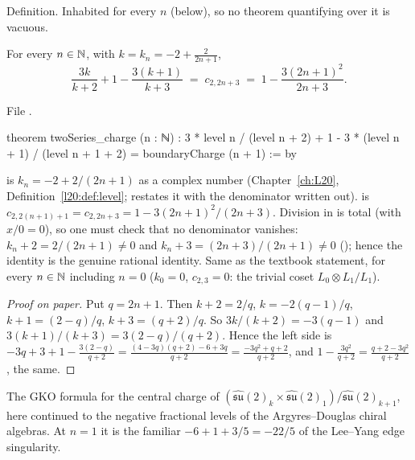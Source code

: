 \begin{status}
Definition. Inhabited for every $n$ (below), so no theorem quantifying over it is vacuous.
\end{status}

\begin{theorem}\label{l29:thm:charge}
For every $n\in{\mathbb{N}}$, with $k=k_n=-2+\frac{2}{2n+1}$,
\begin{equation*}
\frac{3k}{k+2}+1-\frac{3(k+1)}{k+3}\;=\;c_{2,2n+3}\;=\;1-\frac{3(2n+1)^2}{2n+3}.
\end{equation*}
\end{theorem}

\noindent File .
\begin{leancode}
theorem twoSeries_charge (n : ℕ) :
    3 * level n / (level n + 2) + 1 - 3 * (level n + 1) / (level n + 1 + 2) =
      boundaryCharge (n + 1) := by
\end{leancode}

\begin{dictionary}
 is $k_n=-2+2/(2n+1)$ as a complex number (Chapter~\ref{ch:L20}, Definition~\ref{l20:def:level};
 restates it with the denominator written out).  is
$c_{2,2(n+1)+1}=c_{2,2n+3}=1-3(2n+1)^2/(2n+3)$. Division in  is total (with $x/0=0$), so one must check that no
denominator vanishes: $k_n+2=2/(2n+1)\ne0$ and $k_n+3=(2n+3)/(2n+1)\ne0$ (); hence the
identity is the genuine rational identity. Same as the textbook statement, for every $n\in{\mathbb{N}}$ including $n=0$
($k_0=0$, $c_{2,3}=0$: the trivial coset $L_0\otimes L_1/L_1$).
\end{dictionary}

\begin{proof}[Proof on paper]
Put $q=2n+1$. Then $k+2=2/q$, $k=-2(q-1)/q$, $k+1=(2-q)/q$, $k+3=(q+2)/q$. So $3k/(k+2)=-3(q-1)$ and
$3(k+1)/(k+3)=3(2-q)/(q+2)$. Hence the left side is
$-3q+3+1-\frac{3(2-q)}{q+2}=\frac{(4-3q)(q+2)-6+3q}{q+2}=\frac{-3q^2+q+2}{q+2}$, and
$1-\frac{3q^2}{q+2}=\frac{q+2-3q^2}{q+2}$, the same.
\end{proof}

\begin{physics}
The GKO formula for the central charge of $(\widehat{\mathfrak{su}}(2)_k\times\widehat{\mathfrak{su}}(2)_1)/
\widehat{\mathfrak{su}}(2)_{k+1}$, here continued to the negative fractional levels of the Argyres--Douglas chiral
algebras. At $n=1$ it is the familiar $-6+1+3/5=-22/5$ of the Lee--Yang edge singularity.
\end{physics}

